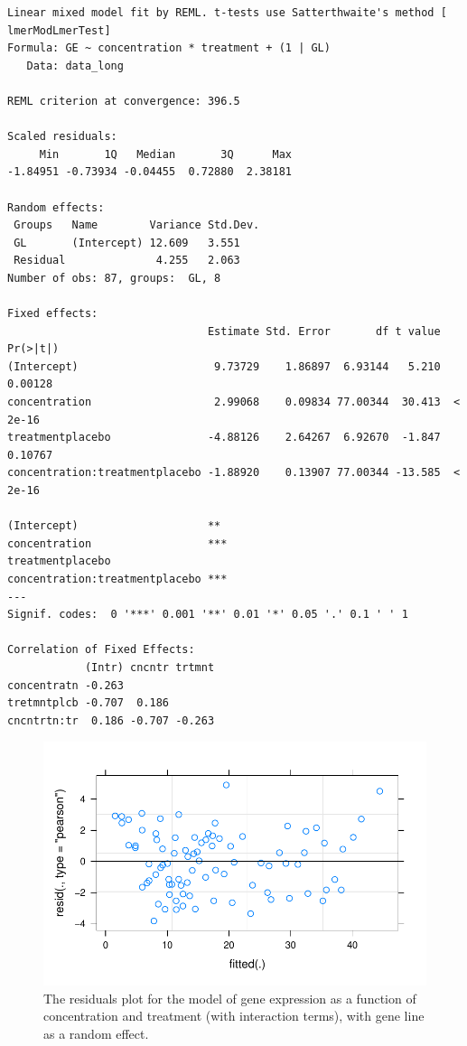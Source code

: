 \documentclass[
  letterpaper,
  DIV=11,
  numbers=noendperiod]{scrartcl}
\begin{document}
\begin{verbatim}
Linear mixed model fit by REML. t-tests use Satterthwaite's method [
lmerModLmerTest]
Formula: GE ~ concentration * treatment + (1 | GL)
   Data: data_long

REML criterion at convergence: 396.5

Scaled residuals: 
     Min       1Q   Median       3Q      Max 
-1.84951 -0.73934 -0.04455  0.72880  2.38181 

Random effects:
 Groups   Name        Variance Std.Dev.
 GL       (Intercept) 12.609   3.551   
 Residual              4.255   2.063   
Number of obs: 87, groups:  GL, 8

Fixed effects:
                               Estimate Std. Error       df t value Pr(>|t|)
(Intercept)                     9.73729    1.86897  6.93144   5.210  0.00128
concentration                   2.99068    0.09834 77.00344  30.413  < 2e-16
treatmentplacebo               -4.88126    2.64267  6.92670  -1.847  0.10767
concentration:treatmentplacebo -1.88920    0.13907 77.00344 -13.585  < 2e-16
                                  
(Intercept)                    ** 
concentration                  ***
treatmentplacebo                  
concentration:treatmentplacebo ***
---
Signif. codes:  0 '***' 0.001 '**' 0.01 '*' 0.05 '.' 0.1 ' ' 1

Correlation of Fixed Effects:
            (Intr) cncntr trtmnt
concentratn -0.263              
tretmntplcb -0.707  0.186       
cncntrtn:tr  0.186 -0.707 -0.263
\end{verbatim}

\begin{figure}

{\centering \includegraphics{2023-05-16_IMRaD-report_AStephenson_files/figure-pdf/fig-m2-plot-1.pdf}

}

\caption{\label{fig-m2-plot}The residuals plot for the model of gene
expression as a function of concentration and treatment (with
interaction terms), with gene line as a random effect.}

\end{figure}
\end{document}
